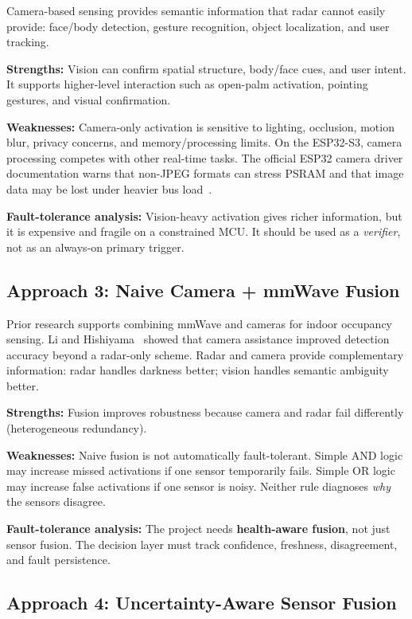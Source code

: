 \documentclass[12pt]{extarticle}
\begin{document}
Camera-based sensing provides semantic information that radar cannot easily provide:
face/body detection, gesture recognition, object localization, and user tracking.

\textbf{Strengths:}
Vision can confirm spatial structure, body/face cues, and user intent.
It supports higher-level interaction such as open-palm activation, pointing gestures,
and visual confirmation.

\textbf{Weaknesses:}
Camera-only activation is sensitive to lighting, occlusion, motion blur, privacy
concerns, and memory/processing limits.
On the ESP32-S3, camera processing competes with other real-time tasks.
The official ESP32 camera driver documentation warns that non-JPEG formats can stress
PSRAM and that image data may be lost under heavier bus load~\cite{espressif_cam}.

\textbf{Fault-tolerance analysis:}
Vision-heavy activation gives richer information, but it is expensive and fragile on
a constrained MCU.
It should be used as a \emph{verifier}, not as an always-on primary trigger.

\subsection{Approach 3: Naive Camera + mmWave Fusion}

Prior research supports combining mmWave and cameras for indoor occupancy sensing.
Li and Hishiyama~\cite{li2023mmwave} showed that camera assistance improved detection
accuracy beyond a radar-only scheme.
Radar and camera provide complementary information: radar handles darkness better;
vision handles semantic ambiguity better.

\textbf{Strengths:}
Fusion improves robustness because camera and radar fail differently (heterogeneous
redundancy).

\textbf{Weaknesses:}
Naive fusion is not automatically fault-tolerant.
Simple AND logic may increase missed activations if one sensor temporarily fails.
Simple OR logic may increase false activations if one sensor is noisy.
Neither rule diagnoses \emph{why} the sensors disagree.

\textbf{Fault-tolerance analysis:}
The project needs \textbf{health-aware fusion}, not just sensor fusion.
The decision layer must track confidence, freshness, disagreement, and fault
persistence.

\subsection{Approach 4: Uncertainty-Aware Sensor Fusion}
\end{document}
